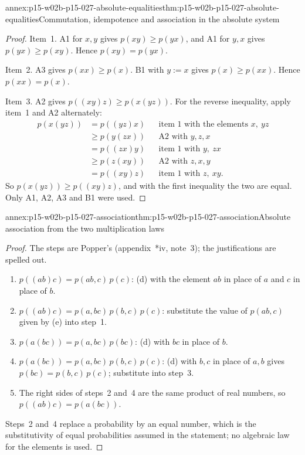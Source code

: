 \begin{annexitem}{annex:p15-w02b-p15-027-absolute-equalities}{thm:p15-w02b-p15-027-absolute-equalities}{Commutation, idempotence and association in the absolute system}
\begin{proof}
Item~1. A1 for \(x,y\) gives \(p(xy)\geqslant p(yx)\), and A1 for \(y,x\)
gives \(p(yx)\geqslant p(xy)\). Hence \(p(xy)=p(yx)\).

Item~2. A3 gives \(p(xx)\geqslant p(x)\). B1 with \(y:=x\) gives
\(p(x)\geqslant p(xx)\). Hence \(p(xx)=p(x)\).

Item~3. A2 gives \(p((xy)z)\geqslant p(x(yz))\). For the reverse
inequality, apply item~1 and A2 alternately:
\[
\begin{aligned}
 p(x(yz))&=p((yz)x) &&\text{item~1 with the elements }x,\ yz\\
 &\geqslant p(y(zx)) &&\text{A2 with }y,z,x\\
 &=p((zx)y) &&\text{item~1 with }y,\ zx\\
 &\geqslant p(z(xy)) &&\text{A2 with }z,x,y\\
 &=p((xy)z) &&\text{item~1 with }z,\ xy.
\end{aligned}
\]
So \(p(x(yz))\geqslant p((xy)z)\), and with the first inequality the two
are equal. Only A1, A2, A3 and B1 were used.
\end{proof}
\end{annexitem}

\begin{annexitem}{annex:p15-w02b-p15-027-association}{thm:p15-w02b-p15-027-association}{Absolute association from the two multiplication laws}
\begin{proof}
The steps are Popper's (appendix~*iv, note~3); the justifications are
spelled out.
\begin{enumerate}
\item \(p((ab)c)=p(ab,c)\,p(c)\): (d) with the element \(ab\) in place of
  \(a\) and \(c\) in place of \(b\).
\item \(p((ab)c)=p(a,bc)\,p(b,c)\,p(c)\): substitute the value of
  \(p(ab,c)\) given by (e) into step~1.
\item \(p(a(bc))=p(a,bc)\,p(bc)\): (d) with \(bc\) in place of \(b\).
\item \(p(a(bc))=p(a,bc)\,p(b,c)\,p(c)\): (d) with \(b,c\) in place of
  \(a,b\) gives \(p(bc)=p(b,c)\,p(c)\); substitute into step~3.
\item The right sides of steps~2 and~4 are the same product of real
  numbers, so \(p((ab)c)=p(a(bc))\).
\end{enumerate}
Steps~2 and~4 replace a probability by an equal number, which is the
substitutivity of equal probabilities assumed in the statement; no
algebraic law for the elements is used.
\end{proof}
\end{annexitem}

